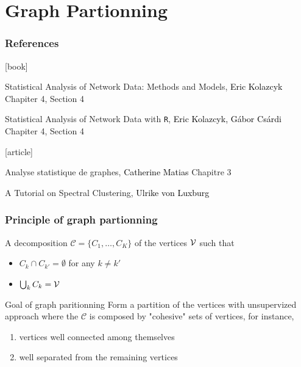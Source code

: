 \documentclass{beamer}\usepackage[]{graphicx}\usepackage[]{color}
\begin{document}
\section{Graph Partionning}

\begin{frame} 
  \frametitle{References}

    \begin{thebibliography}{99}
      [book]

     Statistical Analysis of Network Data: Methods and Models,
    \newblock \textcolor{black}{Eric Kolazcyk}
    \newblock \alert{Chapiter 4, Section 4}

     Statistical Analysis of Network Data with \texttt{R}, 
    \newblock \textcolor{black}{Eric Kolazcyk, G\'abor Cs\'ardi}
    \newblock \alert{Chapiter 4, Section 4}

      [article]

     Analyse statistique de graphes, 
    \newblock \textcolor{black}{Catherine Matias}
    \newblock \alert{Chapitre 3}
    
     A Tutorial on Spectral Clustering, 
    \newblock \textcolor{black}{Ulrike von Luxburg}

    \end{thebibliography}

\end{frame}

\begin{frame}
  \frametitle{Principle of graph partionning}

  \begin{definition}[Partition]
    A decomposition $\mathcal{C} = \{C_1,\dots,C_K\}$ of the vertices $\mathcal{V}$ such that
    \begin{itemize}
      \item $C_k \cap C_{k'} = \emptyset$ for any $k\neq k'$
      \item $\bigcup_{k} C_k = \mathcal{V}$
    \end{itemize}
  \end{definition}

  \vfill

  \begin{block}{Goal of graph paritionning}
    Form a partition of the vertices with unsupervized approach where the $\mathcal{C}$ is composed by \alert{"cohesive"} sets of vertices, for instance,
    \begin{enumerate}
      \item vertices well connected among themselves
      \item well separated from the remaining vertices
    \end{enumerate}
    
  \end{block}

\end{frame}
\end{document}
